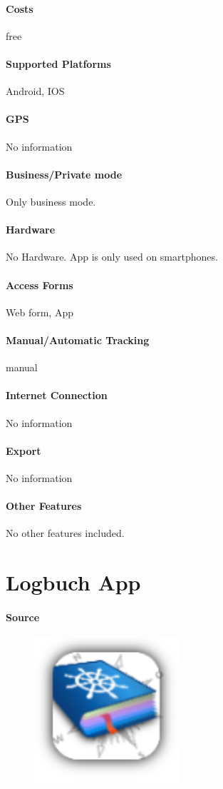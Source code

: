 \paragraph{Costs} free
\paragraph{Supported Platforms} Android, IOS
\paragraph{GPS} No information
\paragraph{Business/Private mode} Only business mode.
\paragraph{Hardware} No Hardware. App is only used on smartphones.
\paragraph{Access Forms}Web form, App
\paragraph{Manual/Automatic Tracking} manual
\paragraph{Internet Connection} No information
\paragraph{Export} No information
\paragraph{Other Features} No other features included.
\newpage

\section{Logbuch App}
\paragraph{Source} 
\begin{figure}
  \begin{center}
    \includegraphics[width=0.48\textwidth]{logbuchapp}
  \end{center}
\end{figure}
